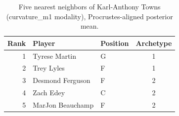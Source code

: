 \begin{table}[htbp]
  \centering\small
  \begin{tabular}{rllc}
    \toprule
    Rank & Player & Position & Archetype \\
    \midrule
    1 & Tyrese Martin & G & 1 \\
    2 & Trey Lyles & F & 1 \\
    3 & Desmond Ferguson & F & 2 \\
    4 & Zach Edey & C & 2 \\
    5 & MarJon Beauchamp & F & 2 \\
    \bottomrule
  \end{tabular}
  \caption{Five nearest neighbors of Karl-Anthony Towns (curvature_m1 modality), Procrustes-aligned posterior mean.}
  \label{tab:Karl_Anthony_Towns_neighbors_curvature_m1}
\end{table}

